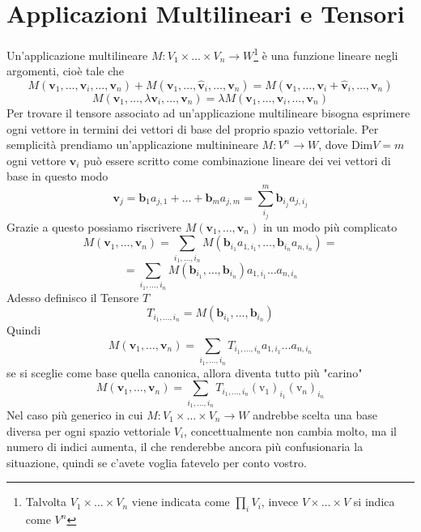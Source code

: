 \documentclass[11pt,a4paper]{report}
\newcommand{\vettore}[1]{\mathbf{#1}}
\newcommand{\vettorec}[1]{\textrm{#1}}
\theoremstyle{definition}
\theoremstyle{plain}
\theoremstyle{plain}
\begin{document}
		\section{Applicazioni Multilineari e Tensori}
			Un'applicazione multilineare $M:V_1\times\dots\times V_n\rightarrow W$\footnote{Talvolta $V_1\times\dots\times V_n$ viene indicata come $\prod_i V_i$, invece $V\times\dots\times V$ si indica come $V^n$} è una funzione lineare negli argomenti, cioè tale che
			\[
				M(\vettore v_1,\dots,\vettore v_i,\dots,\vettore v_n)+M(\vettore v_1,\dots,\vettore{\hat v}_i,\dots,\vettore v_n)=
				M(\vettore v_1,\dots,\vettore v_i+\vettore{\hat v}_i,\dots,\vettore v_n)
			\]
			\begin{equation}
				M(\vettore v_1,\dots,\lambda \vettore v_i,\dots,\vettore v_n)=
				\lambda M(\vettore v_1,\dots,\vettore v_i,\dots,\vettore v_n)
			\end{equation}
			Per trovare il tensore associato ad un'applicazione multilineare bisogna esprimere ogni vettore in termini dei vettori di base del proprio spazio vettoriale.\newline
			Per semplicità prendiamo un'applicazione multinineare $M:V^n\rightarrow W$, dove Dim$V=m$\newline
			ogni vettore $\vettore v_i$ può essere scritto come combinazione lineare dei vei vettori di base in questo modo 
			\[
				\vettore v_j=\vettore b_1 a_{j,1}+\dots +\vettore b_m a_{j,m}=\sum_{i_j}^m\vettore b_{i_j}a_{j,i_j}
			\]
			Grazie a questo possiamo riscrivere $M(\vettore v_1,\dots,\vettore v_n)$ in un modo più complicato\newline
			\[
				M(\vettore v_1,\dots,\vettore v_n)=
				\sum_{i_1,\dots,i_n}M(\vettore b_{i_1}  a_{1,{i_1}},\dots,\vettore b_{i_n} a_{n,{i_n}})=
			\]
			\[
				=\sum_{i_1,\dots,i_n}M(\vettore b_{i_1},\dots,\vettore b_{i_n})a_{1,{i_1}}\dots a_{n,{i_n}}
			\]
			Adesso definisco il Tensore $T$
			\begin{equation}
				T_{i_1,\dots,i_n}=M(\vettore b_{i_1},\dots,\vettore b_{i_n})
			\end{equation}
			Quindi
			\begin{equation}
				M(\vettore v_1,\dots,\vettore v_n)=\sum_{i_1,\dots,i_n}T_{i_1,\dots,i_n}a_{1,{i_1}}\dots a_{n,{i_n}}
			\end{equation}
			se si sceglie come base quella canonica, allora diventa tutto più "carino"
			\[
				M(\vettore v_1,\dots,\vettore v_n)=\sum_{i_1,\dots,i_n}T_{i_1,\dots,i_n}
				(\vettorec v_1)_{i_1}(\vettorec v_n)_{i_n}	
			\]
			Nel caso più generico in cui $M:V_1\times\dots\times V_n\rightarrow W$ andrebbe scelta una base diversa per ogni spazio vettoriale $V_i$, concettualmente non cambia molto, ma il numero di indici aumenta, il che renderebbe ancora più confusionaria la situazione, quindi se c'avete voglia fatevelo per conto vostro.
\end{document}

